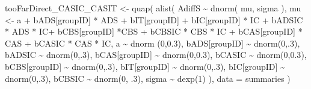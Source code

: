 \documentclass[
  10pt,
  dvipsnames,enabledeprecatedfontcommands]{scrartcl}
\newenvironment{Shaded}{\begin{snugshade}}{\end{snugshade}}
\newcommand{\AttributeTok}[1]{\textcolor[rgb]{0.77,0.63,0.00}{#1}}
\newcommand{\DecValTok}[1]{\textcolor[rgb]{0.00,0.00,0.81}{#1}}
\newcommand{\FloatTok}[1]{\textcolor[rgb]{0.00,0.00,0.81}{#1}}
\newcommand{\FunctionTok}[1]{\textcolor[rgb]{0.00,0.00,0.00}{#1}}
\newcommand{\NormalTok}[1]{#1}
\newcommand{\OtherTok}[1]{\textcolor[rgb]{0.56,0.35,0.01}{#1}}
\newcommand{\SpecialCharTok}[1]{\textcolor[rgb]{0.00,0.00,0.00}{#1}}
\begin{document}
\begin{Shaded}
\begin{Highlighting}[]
\NormalTok{tooFarDirect\_CASIC\_CASIT }\OtherTok{\textless{}{-}} \FunctionTok{quap}\NormalTok{(}
  \FunctionTok{alist}\NormalTok{(}
\NormalTok{    AdiffS }\SpecialCharTok{\textasciitilde{}} \FunctionTok{dnorm}\NormalTok{( mu, sigma ),}
\NormalTok{    mu }\OtherTok{\textless{}{-}}\NormalTok{ a }\SpecialCharTok{+}\NormalTok{ bADS[groupID] }\SpecialCharTok{*}\NormalTok{ ADS }\SpecialCharTok{+}\NormalTok{  bIT[groupID] }\SpecialCharTok{+}\NormalTok{ bIC[groupID] }\SpecialCharTok{*}\NormalTok{ IC }\SpecialCharTok{+} 
\NormalTok{      bADSIC }\SpecialCharTok{*}\NormalTok{ ADS }\SpecialCharTok{*}\NormalTok{ IC}\SpecialCharTok{+}\NormalTok{ bCBS[groupID] }\SpecialCharTok{*}\NormalTok{CBS }\SpecialCharTok{+}\NormalTok{ bCBSIC }\SpecialCharTok{*}\NormalTok{ CBS }\SpecialCharTok{*}\NormalTok{ IC }\SpecialCharTok{+}\NormalTok{ bCAS[groupID] }\SpecialCharTok{*}\NormalTok{ CAS }\SpecialCharTok{+}\NormalTok{ bCASIC }\SpecialCharTok{*}\NormalTok{ CAS }\SpecialCharTok{*}\NormalTok{ IC, }
\NormalTok{    a }\SpecialCharTok{\textasciitilde{}} \FunctionTok{dnorm}\NormalTok{ (}\DecValTok{0}\NormalTok{,}\FloatTok{0.3}\NormalTok{),}
\NormalTok{    bADS[groupID] }\SpecialCharTok{\textasciitilde{}} \FunctionTok{dnorm}\NormalTok{(}\DecValTok{0}\NormalTok{,.}\DecValTok{3}\NormalTok{),}
\NormalTok{    bADSIC }\SpecialCharTok{\textasciitilde{}} \FunctionTok{dnorm}\NormalTok{(}\DecValTok{0}\NormalTok{,.}\DecValTok{3}\NormalTok{),}
\NormalTok{    bCAS[groupID] }\SpecialCharTok{\textasciitilde{}} \FunctionTok{dnorm}\NormalTok{(}\DecValTok{0}\NormalTok{,}\FloatTok{0.3}\NormalTok{),}
\NormalTok{    bCASIC }\SpecialCharTok{\textasciitilde{}} \FunctionTok{dnorm}\NormalTok{(}\DecValTok{0}\NormalTok{,}\FloatTok{0.3}\NormalTok{),}
\NormalTok{    bCBS[groupID] }\SpecialCharTok{\textasciitilde{}} \FunctionTok{dnorm}\NormalTok{(}\DecValTok{0}\NormalTok{,.}\DecValTok{3}\NormalTok{),}
\NormalTok{    bIT[groupID] }\SpecialCharTok{\textasciitilde{}} \FunctionTok{dnorm}\NormalTok{(}\DecValTok{0}\NormalTok{,.}\DecValTok{3}\NormalTok{),}
\NormalTok{    bIC[groupID] }\SpecialCharTok{\textasciitilde{}} \FunctionTok{dnorm}\NormalTok{(}\DecValTok{0}\NormalTok{,.}\DecValTok{3}\NormalTok{),}
\NormalTok{    bCBSIC }\SpecialCharTok{\textasciitilde{}} \FunctionTok{dnorm}\NormalTok{(}\DecValTok{0}\NormalTok{, .}\DecValTok{3}\NormalTok{),}
\NormalTok{    sigma  }\SpecialCharTok{\textasciitilde{}} \FunctionTok{dexp}\NormalTok{(}\DecValTok{1}\NormalTok{)}
\NormalTok{  ), }
  \AttributeTok{data =}\NormalTok{ summaries}
\NormalTok{)}









\end{Highlighting}
\end{Shaded}
\end{document}
